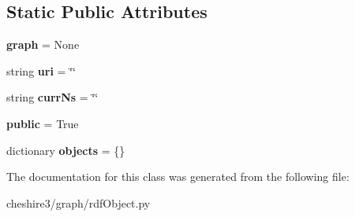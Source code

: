 \subsection*{Static Public Attributes}
\begin{DoxyCompactItemize}
\item 
\hypertarget{classcheshire3_1_1graph_1_1rdf_object_1_1_rdf_object_a086cdc803d2449d570df00903bf1bf52}{{\bfseries graph} = None}\label{classcheshire3_1_1graph_1_1rdf_object_1_1_rdf_object_a086cdc803d2449d570df00903bf1bf52}

\item 
\hypertarget{classcheshire3_1_1graph_1_1rdf_object_1_1_rdf_object_aa7bfe44ca25d030f257f1785d0e145bb}{string {\bfseries uri} = \char`\"{}\char`\"{}}\label{classcheshire3_1_1graph_1_1rdf_object_1_1_rdf_object_aa7bfe44ca25d030f257f1785d0e145bb}

\item 
\hypertarget{classcheshire3_1_1graph_1_1rdf_object_1_1_rdf_object_a736954360003c14749b60c8bcecc8f19}{string {\bfseries curr\-Ns} = \char`\"{}\char`\"{}}\label{classcheshire3_1_1graph_1_1rdf_object_1_1_rdf_object_a736954360003c14749b60c8bcecc8f19}

\item 
\hypertarget{classcheshire3_1_1graph_1_1rdf_object_1_1_rdf_object_acf2dfacbf6e076295124375583fc5a2b}{{\bfseries public} = True}\label{classcheshire3_1_1graph_1_1rdf_object_1_1_rdf_object_acf2dfacbf6e076295124375583fc5a2b}

\item 
\hypertarget{classcheshire3_1_1graph_1_1rdf_object_1_1_rdf_object_a0c5f06a7af072f68bc878b4c1e8a1d81}{dictionary {\bfseries objects} = \{\}}\label{classcheshire3_1_1graph_1_1rdf_object_1_1_rdf_object_a0c5f06a7af072f68bc878b4c1e8a1d81}

\end{DoxyCompactItemize}


The documentation for this class was generated from the following file\-:\begin{DoxyCompactItemize}
\item 
cheshire3/graph/rdf\-Object.\-py\end{DoxyCompactItemize}
